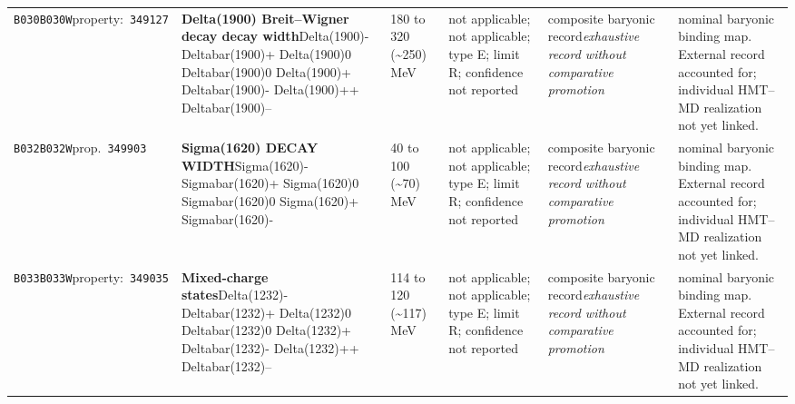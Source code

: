 \begin{landscape}
\begin{longtable}{L{1.85cm}L{4.45cm}L{2.35cm}L{4.05cm}L{3.35cm}L{7.15cm}}
\texttt{B030}\newline \texttt{B030W}\newline property:\ \texttt{349127} & \textbf{Delta(1900) Breit--Wigner decay decay width}\newline Delta(1900)- \textbar{}\allowbreak{} Deltabar(1900)+ \textbar{}\allowbreak{} Delta(1900)0 \textbar{}\allowbreak{} Deltabar(1900)0 \textbar{}\allowbreak{} Delta(1900)+ \textbar{}\allowbreak{} Deltabar(1900)- \textbar{}\allowbreak{} Delta(1900)++ \textbar{}\allowbreak{} Deltabar(1900)-- & 180 to 320 (\textasciitilde{}250)\,MeV & not applicable; not applicable; type E; limit R; confidence not reported & composite baryonic record\newline \emph{exhaustive record without comparative promotion} & nominal baryonic binding map. External record accounted for; individual HMT--MD realization not yet linked. \\
\texttt{B032}\newline \texttt{B032W}\newline prop.\ \texttt{349903} & \textbf{Sigma(1620) DECAY WIDTH}\newline Sigma(1620)- \textbar{}\allowbreak{} Sigmabar(1620)+ \textbar{}\allowbreak{} Sigma(1620)0 \textbar{}\allowbreak{} Sigmabar(1620)0 \textbar{}\allowbreak{} Sigma(1620)+ \textbar{}\allowbreak{} Sigmabar(1620)- & 40 to 100 (\textasciitilde{}70)\,MeV & not applicable; not applicable; type E; limit R; confidence not reported & composite baryonic record\newline \emph{exhaustive record without comparative promotion} & nominal baryonic binding map. External record accounted for; individual HMT--MD realization not yet linked. \\
\texttt{B033}\newline \texttt{B033W}\newline property:\ \texttt{349035} & \textbf{Mixed-charge states}\newline Delta(1232)- \textbar{}\allowbreak{} Deltabar(1232)+ \textbar{}\allowbreak{} Delta(1232)0 \textbar{}\allowbreak{} Deltabar(1232)0 \textbar{}\allowbreak{} Delta(1232)+ \textbar{}\allowbreak{} Deltabar(1232)- \textbar{}\allowbreak{} Delta(1232)++ \textbar{}\allowbreak{} Deltabar(1232)-- & 114 to 120 (\textasciitilde{}117)\,MeV & not applicable; not applicable; type E; limit R; confidence not reported & composite baryonic record\newline \emph{exhaustive record without comparative promotion} & nominal baryonic binding map. External record accounted for; individual HMT--MD realization not yet linked. \\

\end{longtable}
\end{landscape}
